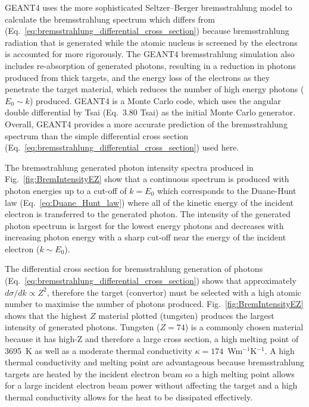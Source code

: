 \documentclass[../main.tex]{subfiles}
\begin{document}
\textsc{GEANT4} uses the more sophisticated Seltzer--Berger bremsstrahlung model \cite{seltzer1986bremsstrahlung,seltzer1985bremsstrahlung} to calculate the bremsstrahlung spectrum which differs from (Eq.~\ref{eq:bremsstrahlung_differential_cross_section}) because bremsstrahlung radiation that is generated while the atomic nucleus is screened by the electrons is accounted for more rigorously. The \textsc{GEANT4} bremsstrahlung simulation \cite{agostinelli2003geant4} also includes re-absorption of generated photons, resulting in a reduction in photons produced from thick targets, and the energy loss of the electrons as they penetrate the target material, which reduces the number of high energy photons ($E_{0}\sim k$) produced. \textsc{GEANT4} is a Monte Carlo code, which uses the angular double differential by Tsai (Eq.~3.80 Tsai) \cite{tsai1974pair,tsai1977erratum} as the initial Monte Carlo generator. Overall, \textsc{GEANT4} provides a more accurate prediction of the bremsstrahlung spectrum than the simple differential cross section (Eq.~\ref{eq:bremsstrahlung_differential_cross_section}) used here.

The bremsstrahlung generated photon intensity spectra produced in Fig.~\ref{fig:BremIntensityEZ} show that a continuous spectrum is produced with photon energies up to a cut-off of $k = E_{0}$ which corresponds to the Duane-Hunt law (Eq.~\ref{eq:Duane_Hunt_law}) where all of the kinetic energy of the incident electron is transferred to the generated photon. The intensity of the generated photon spectrum is largest for the lowest energy photons and decreases with increasing photon energy with a sharp cut-off near the energy of the incident electron ($k \sim E_{0}$).

The differential cross section for bremsstrahlung generation of photons (Eq.~\ref{eq:bremsstrahlung_differential_cross_section}) shows that approximately $d\sigma/dk \propto Z^{2}$, therefore the target (convertor) must be selected with a high atomic number to maximise the number of photons produced. Fig.~\ref{fig:BremIntensityEZ} shows that the highest $Z$ material plotted (tungsten) produces the largest intensity of generated photons. Tungsten ($Z = 74$) is a commonly chosen material because it has high-Z and therefore a large cross section, a high melting point of 3695~\si{\kelvin} as well as a moderate thermal conductivity $\kappa = 174$~\si{\watt}\si{\meter}$^{-1}$\si{\kelvin}$^{-1}$. A high thermal conductivity and melting point are advantageous because bremsstrahlung targets are heated by the incident electron beam so a high melting point allows for a large incident electron beam power without affecting the target and a high thermal conductivity allows for the heat to be dissipated effectively. 
\end{document}
